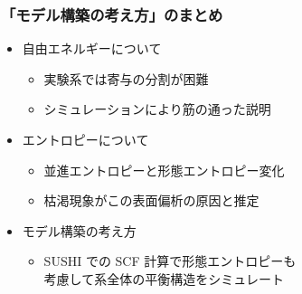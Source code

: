 \documentclass[12pt, dvipdfmx]{beamer}
\begin{document}
\begin{frame}
	\frametitle{「モデル構築の考え方」のまとめ}
        \begin{boxnote}
            \vspace{-3mm}
            \begin{itemize}
                \item 自由エネルギーについて
                    \begin{itemize}
						\item 実験系では寄与の分割が困難
						\item シミュレーションにより筋の通った説明
					\end{itemize} 
                \item エントロピーについて
                    \begin{itemize}
                        \item 並進エントロピーと形態エントロピー変化
                        \item 枯渇現象がこの表面偏析の原因と推定
                    \end{itemize} 
                \item モデル構築の考え方
                    \begin{itemize}
                        \item SUSHI での SCF 計算で形態エントロピーも\\考慮して系全体の平衡構造をシミュレート
                    \end{itemize}
            \end{itemize}
        \end{boxnote}
\end{frame}
\end{document}
